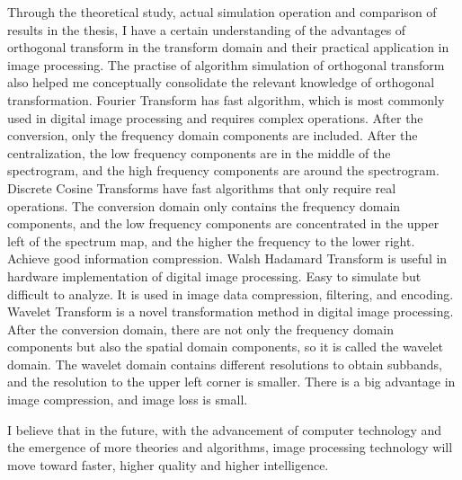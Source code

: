 Through the theoretical study, actual simulation operation and comparison of results in the thesis, I have a certain understanding of the advantages of orthogonal transform in the transform domain and their practical application in image processing. The practise of algorithm simulation of orthogonal transform also helped me conceptually consolidate the relevant knowledge of orthogonal transformation. Fourier Transform has fast algorithm, which is most commonly used in digital image processing and requires complex operations. After the conversion, only the frequency domain components are included. After the centralization, the low frequency components are in the middle of the spectrogram, and the high frequency components are around the spectrogram. Discrete Cosine Transforms have fast algorithms that only require real operations. The conversion domain only contains the frequency domain components, and the low frequency components are concentrated in the upper left of the spectrum map, and the higher the frequency to the lower right. Achieve good information compression. Walsh Hadamard Transform is useful in hardware implementation of digital image processing. Easy to simulate but difficult to analyze. It is used in image data compression, filtering, and encoding. Wavelet Transform is a novel transformation method in digital image processing. After the conversion domain, there are not only the frequency domain components but also the spatial domain components, so it is called the wavelet domain. The wavelet domain contains different resolutions to obtain subbands, and the resolution to the upper left corner is smaller. There is a big advantage in image compression, and image loss is small.

I believe that in the future, with the advancement of computer technology and the emergence of more theories and algorithms, image processing technology will move toward faster, higher quality and higher intelligence.
\clearpage
\null
\clearpage